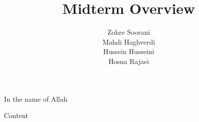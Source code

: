 \documentclass[aspectratio=169, dvipsnames, svgnames, x11names]{beamer}
\title{Midterm Overview}
\author{
Zohre Soorani\\
Mahdi Haghverdi\\
Hussein Husseini\\
Hosna Rajaei\\
}
\institute{
    \\\texttt{[image: logos/logo]}\\
    Isfahan University
}
\begin{document}
\begin{frame}[plain]
\begin{center}
In the name of Allah
\end{center}
\maketitle
\end{frame}

\setcounter{framenumber}{0}
\raggedleft

\begin{frame}{Content}
\begin{flushleft}
\tableofcontents
\end{flushleft}
\end{frame}



\end{document}
